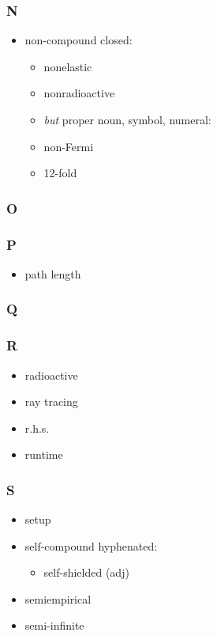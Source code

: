 \documentclass[10pt, letter]{article}
\begin{document}
\begin{multicols}{2}
\subsubsection*{N}
\begin{itemize}
\item non-compound closed:
  \begin{itemize}
  \item nonelastic
  \item nonradioactive
  \item \textit{but} proper noun, symbol, numeral:
  \item non-Fermi
  \item 12-fold
  \end{itemize}
\end{itemize}

\subsubsection*{O}
\subsubsection*{P}
\begin{itemize}
\item path length
\end{itemize}
\subsubsection*{Q}
\subsubsection*{R}
\begin{itemize}
\item radioactive
\item ray tracing
\item r.h.s.
\item runtime
\end{itemize}

\subsubsection*{S}
\begin{itemize}
\item setup
\item self-compound hyphenated:
  \begin{itemize}
  \item self-shielded (adj)
  \end{itemize}
\item semiempirical
\item semi-infinite
\end{itemize}


\end{multicols}
\end{document}
